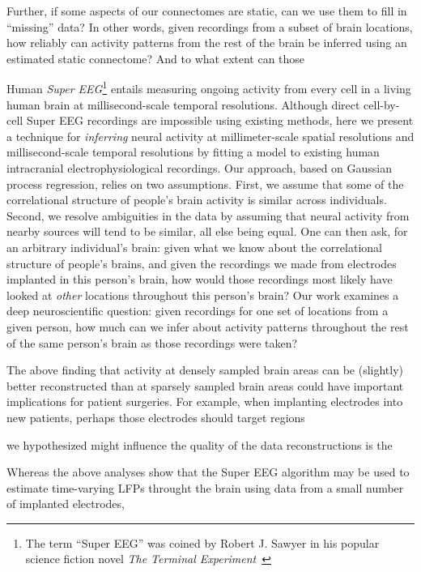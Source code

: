 Further, if some aspects of our connectomes are static, can we use them to fill in ``missing'' data?  In other words, given recordings from a subset of brain locations, how reliably can activity patterns from the rest of the brain be inferred using an estimated static connectome?  And to what extent can those 


Human \textit{Super EEG}\footnote{The term ``Super EEG'' was
coined by Robert J. Sawyer in his popular science fiction novel
\textit{The Terminal Experiment}~\cite{Sawy95}} entails
measuring ongoing activity from every cell in a living human brain
at millisecond-scale temporal resolutions.  Although direct
cell-by-cell Super EEG recordings are impossible using existing
methods, here we present a technique for \textit{inferring} neural
activity at millimeter-scale spatial resolutions and millisecond-scale temporal resolutions by fitting a model to existing human intracranial electrophysiological recordings.  Our approach, based
on Gaussian process regression, relies on two assumptions.  First,
we assume that some of the correlational structure of people's
brain activity is similar across individuals.  Second, we resolve
ambiguities in the data by assuming that neural activity from
nearby sources will tend to be similar, all else being equal.  One
can then ask, for an arbitrary individual's brain: given what we
know about the correlational structure of \textother people's brains,
and given the recordings we made from electrodes implanted in this
person's brain, how would those recordings most likely have looked
at \textit{other} locations throughout this person's brain?  Our work examines a deep neuroscientific question: given recordings for one set of locations from a given person, how much can we infer about activity patterns throughout the rest of the same person's brain as those recordings were taken?

The above finding that activity at densely sampled brain areas can be
(slightly) better reconstructed than at sparsely sampled brain areas
could have important implications for patient surgeries.  For example,
when implanting electrodes into new patients, perhaps those electrodes
should target regions

we hypothesized might influence the quality of the
data reconstructions is the 

Whereas the above analyses show that the Super EEG algorithm may be
used to estimate time-varying LFPs throught the brain using data from a small
number of implanted electrodes, 

